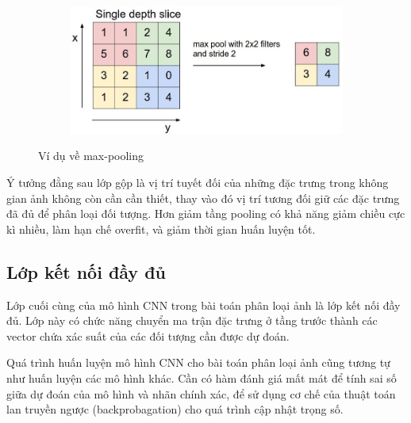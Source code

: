 \begin{figure}
    \begin{subfigure}{1.\textwidth}
        \begin{center}
            \includegraphics[width=1.\linewidth]{Chapters/items/chap2_7.jpg}
        \end{center}
        \label{fig:chap2_7}
    \end{subfigure}
    \caption{Ví dụ về max-pooling}
\end{figure}

Ý tưởng đằng sau lớp gộp là vị trí tuyết đối của những đặc trưng trong không gian ảnh không
còn cần cần thiết, thay vào đó vị trí tương đối giữ các đặc trưng đã đủ để phân loại đối tượng.
Hơn giảm tầng pooling có khả năng giảm chiều cực kì nhiều, làm hạn chế overfit,
và giảm thời gian huấn luyện tốt.

\subsection{Lớp kết nối đầy đủ}

Lớp cuối cùng của mô hình CNN trong bài toán phân loại ảnh là lớp kết nối đầy đủ.
Lớp này có chức năng chuyển ma trận đặc trưng ở tầng trước thành các vector chứa xác suất của các
đối tượng cần được dự đoán.

Quá trình huấn luyện mô hình CNN cho bài toán phân loại ảnh cũng tương tự như huấn luyện các
mô hình khác. Cần có hàm đánh giá mất mát để tính sai số giữa dự đoán của mô hình và nhãn chính xác,
để sử dụng cơ chế của thuật toán lan truyền ngược (backprobagation) cho quá trình cập nhật trọng số.

